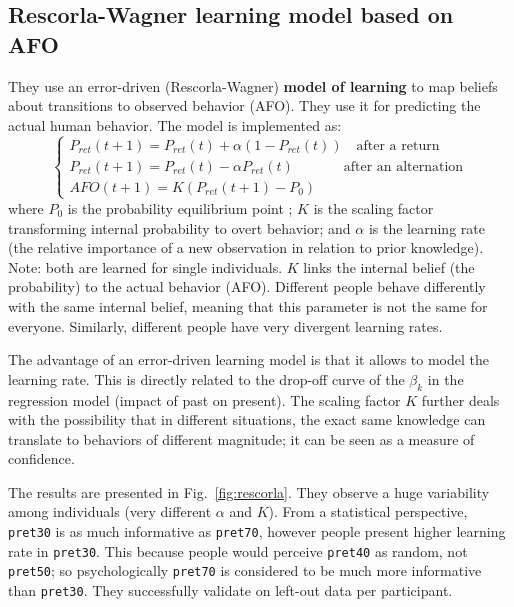 \subsection{Rescorla-Wagner learning model based on AFO}
They use an error-driven (Rescorla-Wagner) \textbf{model of learning} to map beliefs about transitions to observed behavior (AFO). They use it for predicting the actual human behavior. The model is implemented as:
\[
\begin{cases}
    P_{ret}(t+1) = P_{ret}(t) + \alpha(1-P_{ret}(t)) \quad \text{after a return}\\
    P_{ret}(t+1) = P_{ret}(t) - \alpha P_{ret}(t) \quad \quad \quad \;\; \text{after an alternation}\\
    AFO(t+1) = K(P_{ret}(t+1)-P_0)
\end{cases}
\]
where $P_0$ is the probability equilibrium point \notet; $K$ is the scaling factor transforming internal probability to overt behavior; and $\alpha$ is the learning rate (the relative importance of a new observation in relation to prior knowledge). Note: both are learned for single individuals. $K$ links the internal belief (the probability) to the actual behavior (AFO). Different people behave differently with the same internal belief, meaning that this parameter is not the same for everyone. Similarly, different people have very divergent learning rates.

The advantage of an error-driven learning model is that it allows to model the learning rate. This is directly related to the drop-off curve of the $\beta_k$ in the regression model (impact of past on present). The scaling factor $K$ further deals with the possibility that in different situations, the exact same knowledge can translate to behaviors of different magnitude; it can be seen as a measure of confidence.


The results are presented in Fig.~\ref{fig:rescorla}.
They observe a huge variability among individuals (very different $\alpha$ and $K$). From a statistical perspective, \texttt{pret30} is as much informative as \texttt{pret70}, however people present higher learning rate in \texttt{pret30}. This because people would perceive \texttt{pret40} as random, not \texttt{pret50}; so psychologically \texttt{pret70} is considered to be much more informative than \texttt{pret30}.
They successfully validate on left-out data per participant.

